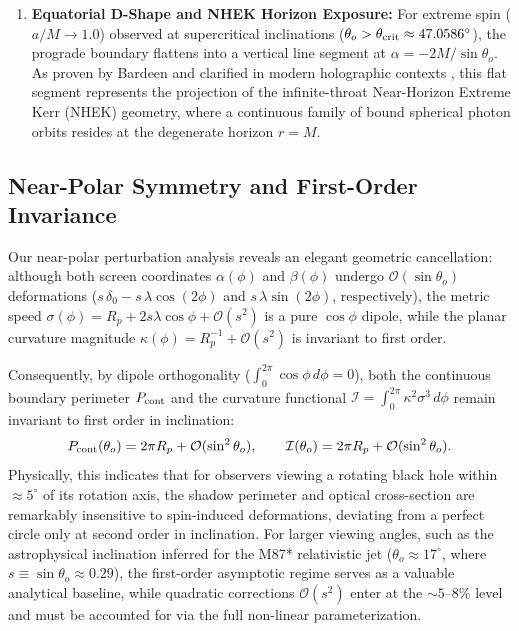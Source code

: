 \begin{enumerate}
    \item \textbf{Equatorial D-Shape and NHEK Horizon Exposure:} For extreme spin ($a/M \to 1.0$) observed at supercritical inclinations ($\theta_o > \theta_{\rm crit} \approx 47.0586^\circ$), the prograde boundary flattens into a vertical line segment at $\alpha = -2M/\sin\theta_o$. As proven by Bardeen \cite{Bardeen1973} and clarified in modern holographic contexts \cite{Gralla2020}, this flat segment represents the projection of the infinite-throat Near-Horizon Extreme Kerr (NHEK) geometry, where a continuous family of bound spherical photon orbits resides at the degenerate horizon $r = M$.
\end{enumerate}

\subsection{Near-Polar Symmetry and First-Order Invariance}
Our near-polar perturbation analysis reveals an elegant geometric cancellation: although both screen coordinates $\alpha(\phi)$ and $\beta(\phi)$ undergo $\mathcal{O}(\sin\theta_o)$ deformations ($s\,\delta_0 - s\,\lambda\cos(2\phi)$ and $s\,\lambda\sin(2\phi)$, respectively), the metric speed $\sigma(\phi) = R_p + 2s\lambda\cos\phi + \mathcal{O}(s^2)$ is a pure $\cos\phi$ dipole, while the planar curvature magnitude $\kappa(\phi) = R_p^{-1} + \mathcal{O}(s^2)$ is invariant to first order.

Consequently, by dipole orthogonality ($\int_0^{2\pi}\cos\phi\,d\phi = 0$), both the continuous boundary perimeter $P_{\rm cont}$ and the curvature functional $\mathcal{I} = \int_0^{2\pi} \kappa^2 \sigma^3\,d\phi$ remain invariant to first order in inclination:
\begin{equation}
    P_{\rm cont}(\theta_o) = 2\pi R_p + \mathcal{O}(\sin^2\theta_o), \qquad \mathcal{I}(\theta_o) = 2\pi R_p + \mathcal{O}(\sin^2\theta_o).
\end{equation}
Physically, this indicates that for observers viewing a rotating black hole within $\approx 5^\circ$ of its rotation axis, the shadow perimeter and optical cross-section are remarkably insensitive to spin-induced deformations, deviating from a perfect circle only at second order in inclination. For larger viewing angles, such as the astrophysical inclination inferred for the M87* relativistic jet ($\theta_o \approx 17^\circ$, where $s \equiv \sin\theta_o \approx 0.29$), the first-order asymptotic regime serves as a valuable analytical baseline, while quadratic corrections $\mathcal{O}(s^2)$ enter at the $\sim 5\text{--}8\%$ level and must be accounted for via the full non-linear parameterization.

